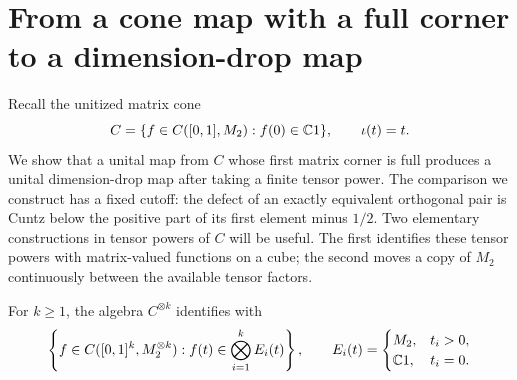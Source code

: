 \section{From a cone map with a full corner to a dimension-drop map}
\label{sec:dimension-drop}

Recall the unitized matrix cone
\[
C=\{f\in C([0,1],M_2):f(0)\in\mathbb C1\},
\qquad \iota(t)=t.
\]
We show that a unital map from \(C\) whose first matrix corner is full
produces a unital dimension-drop map after taking a finite tensor power.
The comparison we construct has a fixed cutoff: the defect of an exactly
equivalent orthogonal pair is Cuntz below the positive part of its first
element minus \(1/2\). Two elementary constructions in tensor powers of
\(C\) will be useful. The first identifies these tensor powers with
matrix-valued functions on a cube; the second moves a copy of \(M_2\)
continuously between the available tensor factors.

\begin{lemma}\label{lem:cone-cube}
For \(k\ge1\), the algebra \(C^{\otimes k}\) identifies with
\[
\left\{
 f\in C([0,1]^k,M_2^{\otimes k}):
 f(t)\in\bigotimes_{i=1}^k E_i(t)
\right\},
\qquad
E_i(t)=
\begin{cases}
M_2,&t_i>0,\\
\mathbb C1,&t_i=0.
\end{cases}
\]
\end{lemma}

